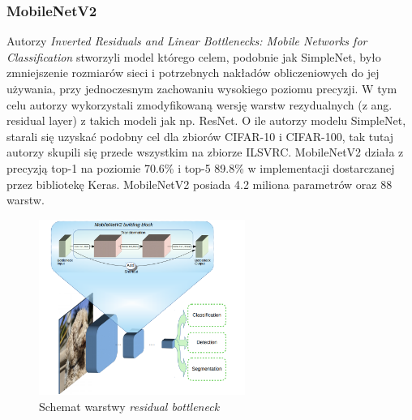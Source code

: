 \documentclass[
    left=2.5cm,         %
    right=2.5cm,        %
    top=2.5cm,          %
    bottom=3cm,         %
    bindingoffset=6mm,  %
    nohyphenation=false %
]{eiti/eiti-thesis}
\begin{document}
        \subsubsection{MobileNetV2}\label{MobileNetV2}
            Autorzy \textit{Inverted Residuals and Linear Bottlenecks: Mobile Networks for Classification}\cite{DBLP:journals/corr/abs-1801-04381}
            stworzyli model którego celem, podobnie jak SimpleNet, było zmniejszenie rozmiarów sieci i potrzebnych nakładów obliczeniowych
            do jej używania, przy jednoczesnym zachowaniu wysokiego poziomu precyzji. W tym celu autorzy wykorzystali
            zmodyfikowaną wersję warstw rezydualnych (z ang. residual layer) z takich modeli jak np. ResNet\cite{DBLP:journals/corr/HeZR016}.
            O ile autorzy modelu SimpleNet, starali się uzyskać
            podobny cel dla zbiorów CIFAR-10 i CIFAR-100, tak tutaj autorzy skupili się przede wszystkim na zbiorze ILSVRC.
            MobileNetV2 działa z precyzją top-1 na poziomie 70.6\% i top-5 89.8\% w implementacji dostarczanej przez bibliotekę Keras.
            MobileNetV2 posiada 4.2 miliona parametrów oraz 88 warstw.

            \begin{figure}[H]
            \begin{center}
            \caption{Schemat warstwy \textit{residual bottleneck}\cite{MobileNetV2_GoogleAI_Blogpost}}
            \includegraphics[width=0.6\textwidth]{eiti/mobilenetv2_overview.png}
            \end{center}
            \end{figure}
\end{document}
